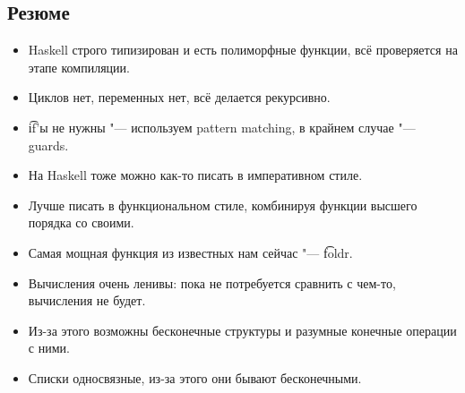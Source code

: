 \subsection{Резюме}

\begin{frame}
\end{frame}

\begin{frame}
	\begin{itemize}
		\item Haskell строго типизирован и есть полиморфные функции, всё проверяется на этапе компиляции.
		\item Циклов нет, переменных нет, всё делается рекурсивно.
		\item \t{if}'ы не нужны "--- используем pattern matching, в крайнем случае "--- guards.
		\item На Haskell тоже можно как-то писать в императивном стиле.
		\item Лучше писать в функциональном стиле, комбинируя функции высшего порядка со своими.
		\item Самая мощная функция из известных нам сейчас "--- \t{foldr}.
		\item Вычисления очень ленивы: пока не потребуется сравнить с чем-то, вычисления не будет.
		\item Из-за этого возможны бесконечные структуры и разумные конечные операции с ними.
		\item Списки односвязные, из-за этого они бывают бесконечными.
	\end{itemize}
\end{frame}
